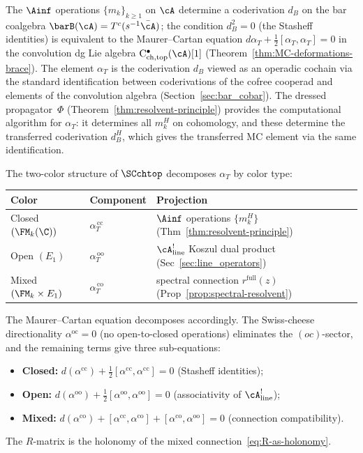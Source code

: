 \begin{construction}
\label{rem:universal-element}
The $\Ainf$ operations $\{m_k\}_{k \geq 1}$ on $\cA$
determine a coderivation $d_B$ on the bar coalgebra
$\barB(\cA) = T^c(s^{-1}\bar\cA)$; the condition $d_B^2 = 0$
(the Stasheff identities) is equivalent to the Maurer--Cartan
equation
$d\alpha_T + \tfrac{1}{2}[\alpha_T, \alpha_T] = 0$
in the convolution dg Lie algebra
$\mathrm{C}^\bullet_{\mathrm{ch,top}}(\cA)[1]$
(Theorem~\ref{thm:MC-deformations-brace}). The element
$\alpha_T$ is the coderivation $d_B$ viewed as an operadic
cochain via the standard identification between coderivations
of the cofree cooperad and elements of the convolution algebra
(Section~\ref{sec:bar_cobar}). The dressed propagator~$\Phi$
(Theorem~\ref{thm:resolvent-principle}) provides the
computational algorithm for $\alpha_T$: it determines all $m_k^H$
on cohomology, and these determine the transferred coderivation
$d_B^H$, which gives the transferred MC element via the same
identification.

The two-color structure of $\SCchtop$ decomposes
$\alpha_T$ by color type:
\begin{center}
\renewcommand{\arraystretch}{1.3}
\begin{tabular}{@{}lll@{}}
\textbf{Color} & \textbf{Component} &
 \textbf{Projection} \\
\hline
Closed $(\FM_k(\C))$ &
 $\alpha_T^{\,\mathrm{cc}}$ &
 $\Ainf$ operations $\{m_k^H\}$
 \quad\textup{(Thm~\ref{thm:resolvent-principle})} \\
Open $(E_1)$ &
 $\alpha_T^{\,\mathrm{oo}}$ &
 $\cA^!_{\mathrm{line}}$ Koszul dual product
 \quad\textup{(Sec~\ref{sec:line_operators})} \\
Mixed $(\FM_k \times E_1)$ &
 $\alpha_T^{\,\mathrm{co}}$ &
 spectral connection $r^{\mathrm{full}}(z)$
 \quad\textup{(Prop~\ref{prop:spectral-resolvent})}
\end{tabular}
\end{center}
The Maurer--Cartan equation decomposes accordingly. The
Swiss-cheese directionality $\alpha^{\mathrm{oc}} = 0$
(no open-to-closed operations) eliminates the $(oc)$-sector,
and the remaining terms give three sub-equations:
\begin{itemize}[leftmargin=1.8em]
\item \textbf{Closed:}
 $d(\alpha^{\mathrm{cc}}) +
 \tfrac{1}{2}[\alpha^{\mathrm{cc}}, \alpha^{\mathrm{cc}}] = 0$
 \quad (Stasheff identities);
\item \textbf{Open:}
 $d(\alpha^{\mathrm{oo}}) +
 \tfrac{1}{2}[\alpha^{\mathrm{oo}}, \alpha^{\mathrm{oo}}] = 0$
 \quad (associativity of $\cA^!_{\mathrm{line}}$);
\item \textbf{Mixed:}
 $d(\alpha^{\mathrm{co}}) +
 [\alpha^{\mathrm{cc}}, \alpha^{\mathrm{co}}] +
 [\alpha^{\mathrm{co}}, \alpha^{\mathrm{oo}}] = 0$
 \quad (connection compatibility).
\end{itemize}
The $R$-matrix is the holonomy of the mixed
connection~\eqref{eq:R-as-holonomy}.
\end{construction}

